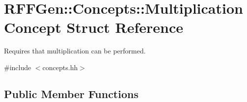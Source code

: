 \hypertarget{structRFFGen_1_1Concepts_1_1MultiplicationConcept}{\section{R\-F\-F\-Gen\-:\-:Concepts\-:\-:Multiplication\-Concept Struct Reference}
\label{structRFFGen_1_1Concepts_1_1MultiplicationConcept}
}


Requires that multiplication can be performed.  




{\ttfamily \#include $<$concepts.\-hh$>$}

\subsection*{Public Member Functions}
